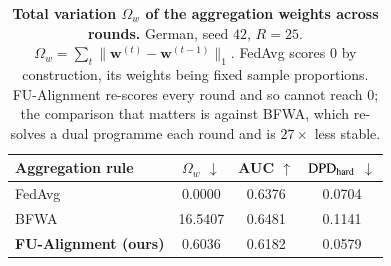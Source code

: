\begin{table}[t]
\centering
\small
\caption{\textbf{Total variation $\Omega_w$ of the aggregation weights across rounds.}
German, seed $42$, $R = 25$. $\Omega_w = \sum_t \lVert \bm{w}^{(t)} - \bm{w}^{(t-1)}\rVert_1$.
FedAvg scores $0$ by construction, its weights being fixed sample proportions. FU-Alignment re-scores
every round and so cannot reach $0$; the comparison that matters is against BFWA, which re-solves a
dual programme each round and is $27\times$ less stable.}
\label{tab:weight_stability}
\begin{tabular}{lccc}
\toprule
\textbf{Aggregation rule} & \textbf{$\Omega_w$ $\downarrow$} & \textbf{AUC $\uparrow$} & \textbf{$\mathrm{DPD}_{\mathrm{hard}}$ $\downarrow$} \\
\midrule
FedAvg & 0.0000 & 0.6376 & 0.0704 \\
BFWA~\cite{dang2026fedfairgnn} & 16.5407 & 0.6481 & 0.1141 \\
\textbf{FU-Alignment (ours)} & 0.6036 & 0.6182 & 0.0579 \\
\bottomrule
\end{tabular}
\end{table}
